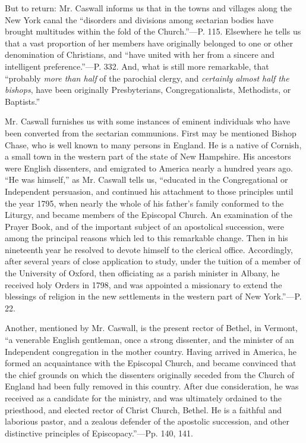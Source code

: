 But to return: Mr. Caswall informs us that in the
towns and villages along the New York canal the ``disorders and
divisions among sectarian bodies have brought multitudes within
the fold of the Church.''—P. 115. Elsewhere he tells us that a vast
proportion of her members have originally belonged to one or other
denomination of Christians, and ``have united with her from a sincere
and intelligent preference.''—P. 332. And, what is still more
remarkable, that ``probably \emph{more than half} of the parochial
clergy, and \emph{certainly almost half the bishops}, have been
originally Presbyterians, Congregationalists, Methodists, or Baptists.''

Mr. Caswall furnishes us with some instances of
eminent individuals who have been converted from the sectarian
communions. First may be mentioned Bishop Chase, who is well known to
many persons in England. He is a native of Cornish, a small town in
the western part of the state of New Hampshire. His ancestors were
English dissenters, and emigrated to America nearly a hundred years
ago. ``He was himself,'' as Mr. Caswall tells us, ``educated in the
Congregational or Independent persuasion, and continued his attachment
to those principles until the year 1795, when nearly the whole of his
father's family conformed to the Liturgy, and became members of the
Episcopal Church. An examination of the Prayer Book, and of the
important subject of an apostolical succession, were among the
principal reasons which led to this remarkable change. Then in his
nineteenth year he resolved to devote himself to the clerical office.
Accordingly, after several years of close application to study, under
the tuition of a member of the University of Oxford, then officiating
as a parish minister in Albany, he received holy Orders in 1798, and
was appointed a missionary to extend the blessings of religion in the
new settlements in the western part of New York.''—P. 22.

Another, mentioned by Mr. Caswall, is the present
rector of Bethel, in Vermont, ``a venerable English gentleman,
once a strong dissenter, and the minister of an Independent
congregation in the mother country. Having arrived in America, he
formed an acquaintance with the Episcopal Church, and became convinced
that the chief grounds on which the dissenters originally seceded from
the Church of England had been fully removed in this country. After
due consideration, he was received as a candidate for the ministry,
and was ultimately ordained to the priesthood, and elected rector of
Christ Church, Bethel. He is a faithful and laborious pastor, and a
zealous defender of the apostolic succession, and other distinctive
principles of Episcopacy.''—Pp. 140, 141.

